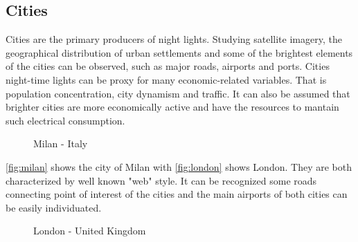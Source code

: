 \subsection{Cities}
Cities are the primary producers of night lights. Studying satellite imagery, the geographical distribution of urban settlements and some of the brightest elements of the cities can be observed, such as major roads,  airports and ports.
Cities night-time lights can be proxy for many economic-related variables. That is population concentration, city dynamism and traffic. It can also be assumed that brighter cities are more economically active and have the resources to mantain such electrical consumption.
\begin{figure}[h!]
    \centering
    \qquad
    \caption{Milan - Italy}%
    \label{fig:milan}
\end{figure}
\autoref{fig:milan} shows the city of Milan with \autoref{fig:london} shows London. They are both characterized by well known "web" style. It can be recognized some roads connecting point of interest of the cities and the main airports of both cities can be easily individuated.
\begin{figure}[h!]
    \centering
    \qquad
    \caption{London - United Kingdom}%
    \label{fig:london}
\end{figure}

